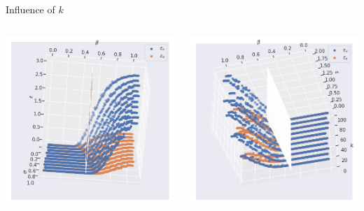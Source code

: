 \documentclass{beamer}
\begin{document}
\begin{frame}{Influence of $k$}
	\begin{minipage}[0.95\textheight]{\textwidth}
	\begin{columns}[T]
	\begin{column}{0.50\textwidth}
	\includegraphics[width=\textwidth, keepaspectratio]{../images/N100_3d.png}
	\end{column}
	\begin{column}{0.50\textwidth}
	\includegraphics[width=\textwidth, keepaspectratio]{../images/sigma1_3d.png}
	\end{column}
	\end{columns}
	\end{minipage}
\end{frame}
\end{document}
